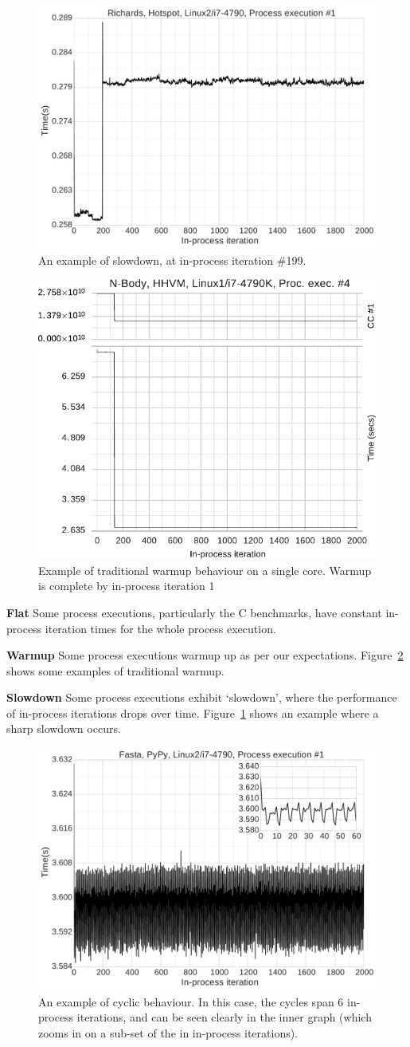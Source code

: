 \documentclass[preprint,numbers,10pt]{sigplanconf}
\begin{document}
\begin{figure}[tbp]
\includegraphics[width=.475\textwidth]{examples/slowdown1}
\caption{An example of slowdown, at in-process iteration \#199.}
\label{fig:examples:slowdown1}
\end{figure}

\begin{figure}[tbp]
\centering
\includegraphics[width=.45\textwidth]{examples/new_warmup_no_migrate.pdf}
\caption{Example of traditional warmup behaviour on a single core. Warmup is
complete by in-process iteration 1}
\label{fig:examples:trad}
\end{figure}

\textbf{Flat} Some process executions, particularly the C benchmarks, have
constant in-process iteration times for the whole process execution.

\textbf{Warmup} Some process executions warmup up as per our
expectations. Figure~\ref{fig:examples:trad} shows some examples of traditional
warmup.

\textbf{Slowdown} \label{sub:slowdowns}
Some process executions exhibit `slowdown', where the performance of
in-process iterations drops over time. Figure~\ref{fig:examples:slowdown1} shows
an example where a sharp slowdown occurs.

\begin{figure}[tbp]
\includegraphics[width=.475\textwidth]{examples/cycles1}
\caption{An example of cyclic behaviour. In this case, the cycles span 6 in-process iterations,
and can be seen clearly in the inner graph (which zooms in on a sub-set of the in in-process
iterations).}
\label{fig:examples:cycles}
\end{figure}
\end{document}
